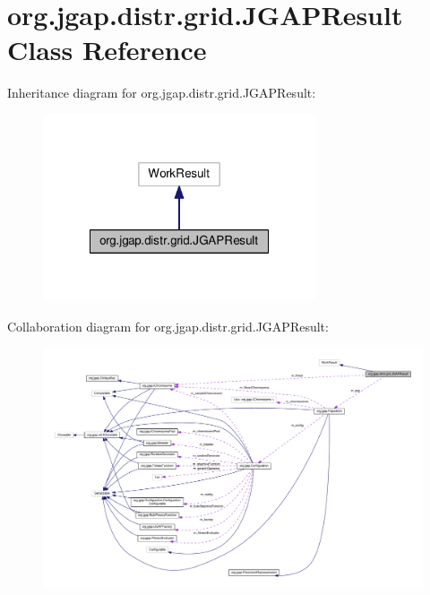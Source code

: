 \hypertarget{classorg_1_1jgap_1_1distr_1_1grid_1_1_j_g_a_p_result}{\section{org.\-jgap.\-distr.\-grid.\-J\-G\-A\-P\-Result Class Reference}
\label{classorg_1_1jgap_1_1distr_1_1grid_1_1_j_g_a_p_result}
}


Inheritance diagram for org.\-jgap.\-distr.\-grid.\-J\-G\-A\-P\-Result\-:
\nopagebreak
\begin{figure}[H]
\begin{center}
\leavevmode
\includegraphics[width=228pt]{classorg_1_1jgap_1_1distr_1_1grid_1_1_j_g_a_p_result__inherit__graph}
\end{center}
\end{figure}


Collaboration diagram for org.\-jgap.\-distr.\-grid.\-J\-G\-A\-P\-Result\-:
\nopagebreak
\begin{figure}[H]
\begin{center}
\leavevmode
\includegraphics[width=350pt]{classorg_1_1jgap_1_1distr_1_1grid_1_1_j_g_a_p_result__coll__graph}
\end{center}
\end{figure}
